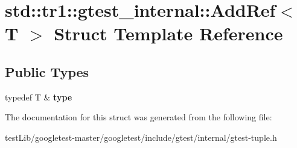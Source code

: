 \hypertarget{structstd_1_1tr1_1_1gtest__internal_1_1AddRef}{}\section{std\+:\+:tr1\+:\+:gtest\+\_\+internal\+:\+:Add\+Ref$<$ T $>$ Struct Template Reference}
\label{structstd_1_1tr1_1_1gtest__internal_1_1AddRef}
\subsection*{Public Types}
\begin{DoxyCompactItemize}
\item 
\mbox{\label{structstd_1_1tr1_1_1gtest__internal_1_1AddRef_a1e5616e414125574c1653e3a1fc68491}} 
typedef T \& {\bfseries type}
\end{DoxyCompactItemize}


The documentation for this struct was generated from the following file\+:\begin{DoxyCompactItemize}
\item 
test\+Lib/googletest-\/master/googletest/include/gtest/internal/gtest-\/tuple.\+h\end{DoxyCompactItemize}
